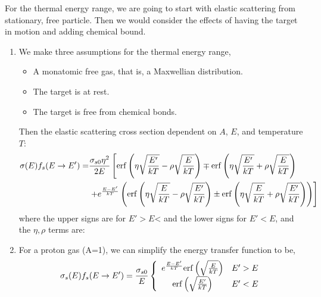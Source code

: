 \documentclass{school-22.211-notes}
\begin{document}
\clearpage
{}
For the thermal energy range, we are going to start with elastic scattering from stationary, free particle. Then we would consider the effects of having the target in motion and adding chemical bound.
\begin{enumerate}
\item We make three assumptions for the thermal energy range, 
  \begin{itemize}
  \item A monatomic free gas, that is, a Maxwellian distribution. 
  \item The target is at rest. 
  \item The target is free from chemical bonds. 
  \end{itemize}

Then the elastic scattering cross section dependent on $A$, $E$, and temperature $T$:
\begin{align}
  \sigma(E) f_s (E \to E') = &\frac{\sigma_{s0} \eta^2}{2E} \left[ \mathrm{erf}\left( \eta \sqrt{\frac{E'}{kT}} - \rho \sqrt{\frac{E}{kT}}  \right) \mp \mathrm{erf}\left( \eta \sqrt{\frac{E'}{kT}} + \rho \sqrt{\frac{E}{kT}}  \right) \right. \notag \\
    & \left. + e^{\frac{E - E'}{kT}} \left( \mathrm{erf}\left(  \eta \sqrt{\frac{E}{kT}} - \rho \sqrt{\frac{E'}{kT}}  \right)  \pm \mathrm{erf}\left( \eta \sqrt{\frac{E}{kT}} + \rho \sqrt{\frac{E'}{kT}}  \right) \right) \right] 
\end{align}
where the upper signs are for $E' > E$< and the lower signs for $E' < E$, and the $\eta, \rho$ terms are:

\item For a proton gas (A=1), we can simplify the energy transfer function to be,
\begin{align}
\sigma_s(E) f_s(E\to E') = \frac{\sigma_{s0}}{E} \left\{ 
\begin{array}{cc}
e^{\frac{E-E'}{kT}} \mathrm{erf}\left( \sqrt{\frac{E}{kT}} \right) & E' > E \\
\mathrm{erf}\left( \sqrt{\frac{E'}{kT}} \right) & E' < E 
\end{array}
\right.
\end{align}


\end{enumerate}
\end{document}
